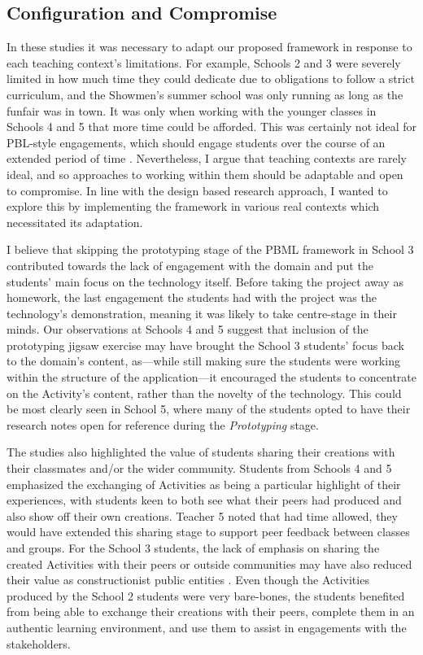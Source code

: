 \subsection{Configuration and Compromise}
In these studies it was necessary to adapt our proposed framework in response to each teaching context's limitations. For example, Schools 2 and 3 were severely limited in how much time they could dedicate due to obligations to follow a strict curriculum, and the Showmen's summer school was only running as long as the funfair was in town. It was only when working with the younger classes in Schools 4 and 5 that more time could be afforded. This was certainly not ideal for PBL-style engagements, which should engage students over the course of an extended period of time \citep{Blumenfeld1991}. Nevertheless, I argue that teaching contexts are rarely ideal, and so approaches to working within them should be adaptable and open to compromise. In line with the design based research approach, I wanted to explore this by implementing the framework in various real contexts which necessitated its adaptation.

I believe that skipping the prototyping stage of the PBML framework in School 3 contributed towards the lack of engagement with the domain and put the students' main focus on the technology itself. Before taking the project away as homework, the last engagement the students had with the project was the technology's demonstration, meaning it was likely to take centre-stage in their minds. Our observations at Schools 4 and 5 suggest that inclusion of the prototyping jigsaw exercise may have brought the School 3 students' focus back to the domain's content, as---while still making sure the students were working within the structure of the application---it encouraged the students to concentrate on the Activity's content, rather than the novelty of the technology. This could be most clearly seen in School 5, where many of the students opted to have their research notes open for reference during the \textit{Prototyping} stage.

The studies also highlighted the value of students sharing their creations with their classmates and/or the wider community. Students from Schools 4 and 5 emphasized the exchanging of Activities as being a particular highlight of their experiences, with students keen to both see what their peers had produced and also show off their own creations. Teacher 5 noted that had time allowed, they would have extended this sharing stage to support peer feedback between classes and groups. For the School 3 students, the lack of emphasis on sharing the created Activities with their peers or outside communities may have also reduced their value as constructionist public entities \citep{PapertSeymourandHarel1991a}. Even though the Activities produced by the School 2 students were very bare-bones, the students benefited from being able to exchange their creations with their peers, complete them in an authentic learning environment, and use them to assist in engagements with the stakeholders.

